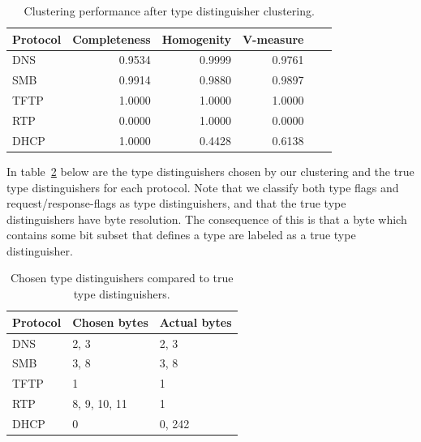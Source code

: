 \documentclass[a4paper]{report}
\begin{document}
\begin{table}[h]
    \centering
    \captionsetup{width=0.8\textwidth}
    \caption{Clustering performance after type distinguisher clustering.}
    \begin{tabular}{| l | r | r | r | r | r |}
        \hline
        \textbf{Protocol}&\textbf{Completeness}&\textbf{Homogenity}&\textbf{V-measure} \\ \hline
        DNS & 0.9534 & 0.9999 & 0.9761 \\ \hline
        SMB & 0.9914 & 0.9880 & 0.9897 \\ \hline
        TFTP & 1.0000 & 1.0000 & 1.0000 \\ \hline
        RTP & 0.0000 & 1.0000 & 0.0000 \\ \hline
        DHCP & 1.0000 & 0.4428 & 0.6138 \\ \hline
    \end{tabular}
    \label{tab:tdclusterresults}
\end{table}






In table~\ref{tab:typedistinguishers} below are the type distinguishers chosen
by our clustering and the true type distinguishers for each protocol. Note that
we classify both type flags and request/response-flags as type distinguishers,
and that the true type distinguishers have byte resolution. The consequence of
this is that a byte which contains some bit subset that defines a type are
labeled as a true type distinguisher.

\begin{table}[h]
    \centering
    \captionsetup{width=0.8\textwidth}
    \caption{Chosen type distinguishers compared to true type distinguishers.}
    \begin{tabular}{| l | l | l |}
        \hline
        \textbf{Protocol}&\textbf{Chosen bytes}&\textbf{Actual bytes}\\ \hline
        DNS  & 2, 3         & 2, 3  \\ \hline
        SMB  & 3, 8         & 3, 8  \\ \hline
        TFTP & 1            & 1     \\ \hline
        RTP  & 8, 9, 10, 11 & 1     \\ \hline
        DHCP & 0            & 0, 242\\ \hline
    \end{tabular}
    \label{tab:typedistinguishers}
\end{table}
\end{document}
